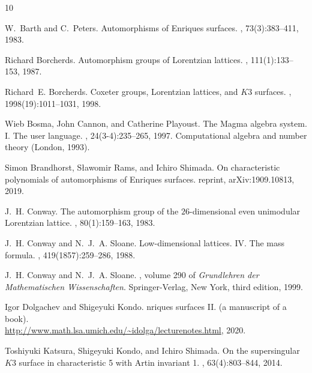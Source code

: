 \documentclass{amsart}
\numberwithin{equation}{section}
\numberwithin{table}{section}
\numberwithin{figure}{section}
\begin{document}

%

\begin{thebibliography}{10}

W.~Barth and C.~Peters.
\newblock Automorphisms of {E}nriques surfaces.
, 73(3):383--411, 1983.

Richard Borcherds.
\newblock Automorphism groups of {L}orentzian lattices.
, 111(1):133--153, 1987.

Richard~E. Borcherds.
\newblock Coxeter groups, {L}orentzian lattices, and {$K3$} surfaces.
, 1998(19):1011--1031, 1998.

Wieb Bosma, John Cannon, and Catherine Playoust.
\newblock The {M}agma algebra system. {I}. {T}he user language.
, 24(3-4):235--265, 1997.
\newblock Computational algebra and number theory (London, 1993).

Simon Brandhorst, Sławomir Rams, and Ichiro Shimada.
\newblock On characteristic polynomials of automorphisms of {E}nriques
  surfaces.
reprint, ar{X}iv:1909.10813, 2019.

J.~H. Conway.
\newblock The automorphism group of the {$26$}-dimensional even unimodular
  {L}orentzian lattice.
, 80(1):159--163, 1983.

J.~H. Conway and N.~J.~A. Sloane.
\newblock Low-dimensional lattices. {IV}. {T}he mass formula.
, 419(1857):259--286, 1988.

J.~H. Conway and N.~J.~A. Sloane.
, volume 290 of {\em
  Grundlehren der Mathematischen Wissenschaften}.
\newblock Springer-Verlag, New York, third edition, 1999.

Igor Dolgachev and Shigeyuki Kondo.
nriques surfaces {II}. \newblock (a manuscript of a book).\\
\newblock \url{http://www.math.lsa.umich.edu/~idolga/lecturenotes.html}, 2020.



Toshiyuki Katsura, Shigeyuki Kondo, and Ichiro Shimada.
\newblock On the supersingular {$K3$} surface in characteristic 5 with {A}rtin
  invariant 1.
, 63(4):803--844, 2014.


\end{thebibliography}
\end{document}
